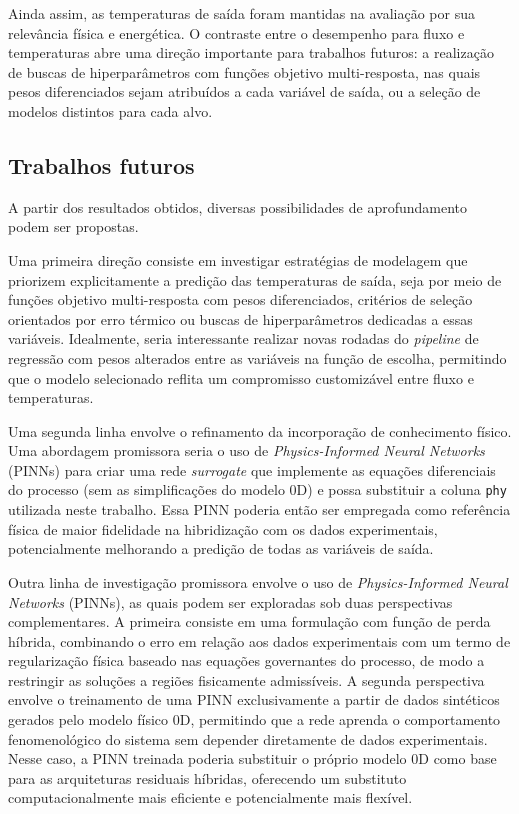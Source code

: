 Ainda assim, as temperaturas de saída foram mantidas na avaliação por sua relevância física e energética. O contraste entre o desempenho para fluxo e temperaturas abre uma direção importante para trabalhos futuros: a realização de buscas de hiperparâmetros com funções objetivo multi-resposta, nas quais pesos diferenciados sejam atribuídos a cada variável de saída, ou a seleção de modelos distintos para cada alvo.

\subsection{Trabalhos futuros}

A partir dos resultados obtidos, diversas possibilidades de aprofundamento podem ser propostas.

Uma primeira direção consiste em investigar estratégias de modelagem que priorizem explicitamente a predição das temperaturas de saída, seja por meio de funções objetivo multi-resposta com pesos diferenciados, critérios de seleção orientados por erro térmico ou buscas de hiperparâmetros dedicadas a essas variáveis. Idealmente, seria interessante realizar novas rodadas do \textit{pipeline} de regressão com pesos alterados entre as variáveis na função de escolha, permitindo que o modelo selecionado reflita um compromisso customizável entre fluxo e temperaturas.

Uma segunda linha envolve o refinamento da incorporação de conhecimento físico. Uma abordagem promissora seria o uso de \textit{Physics-Informed Neural Networks} (PINNs) para criar uma rede \textit{surrogate} que implemente as equações diferenciais do processo (sem as simplificações do modelo 0D) e possa substituir a coluna \texttt{phy} utilizada neste trabalho. Essa PINN poderia então ser empregada como referência física de maior fidelidade na hibridização com os dados experimentais, potencialmente melhorando a predição de todas as variáveis de saída.

Outra linha de investigação promissora envolve o uso de \textit{Physics-Informed Neural Networks} (PINNs), as quais podem ser exploradas sob duas perspectivas complementares. A primeira consiste em uma formulação com função de perda híbrida, combinando o erro em relação aos dados experimentais com um termo de regularização física baseado nas equações governantes do processo, de modo a restringir as soluções a regiões fisicamente admissíveis. A segunda perspectiva envolve o treinamento de uma PINN exclusivamente a partir de dados sintéticos gerados pelo modelo físico 0D, permitindo que a rede aprenda o comportamento fenomenológico do sistema sem depender diretamente de dados experimentais. Nesse caso, a PINN treinada poderia substituir o próprio modelo 0D como base para as arquiteturas residuais híbridas, oferecendo um substituto computacionalmente mais eficiente e potencialmente mais flexível.


